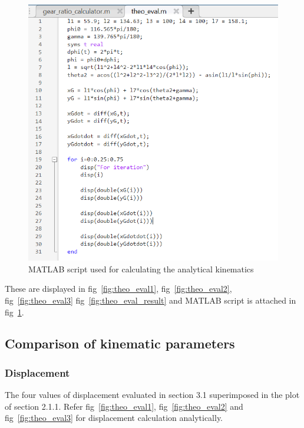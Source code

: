         \begin{figure}[hbt!]
            \centering
            \includegraphics[width=0.9\columnwidth]{Images/matlab_script.png}
            \caption{MATLAB script used for calculating the analytical kinematics}
            \label{fig:matlab_script}
        \end{figure}

        These are displayed in fig~\ref{fig:theo_eval1}, fig~\ref{fig:theo_eval2}, fig~\ref{fig:theo_eval3} fig~\ref{fig:theo_eval_result} and MATLAB script is attached in fig~\ref{fig:matlab_script}.

    \subsection{Comparison of kinematic parameters}
        \subsubsection{Displacement}
            The four values of displacement evaluated in section 3.1 superimposed in the plot of section 2.1.1. Refer fig~\ref{fig:theo_eval1}, fig~\ref{fig:theo_eval2} and fig~\ref{fig:theo_eval3} for displacement calculation analytically. 

